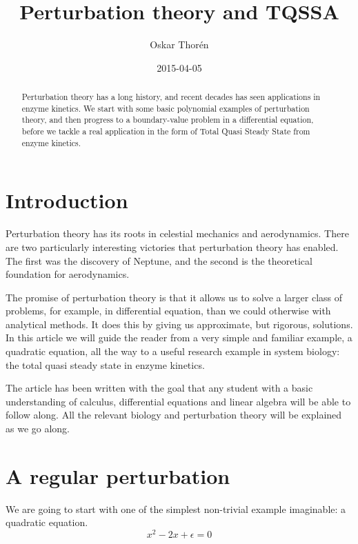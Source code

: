 \documentclass[12pt]{article}
\title{Perturbation theory and TQSSA}
\author{Oskar Thor\'{e}n}
\date{2015-04-05}
\begin{document}
\nocite{*} %
\maketitle

\begin{abstract}
Perturbation theory has a long history, and recent decades has seen applications
in enzyme kinetics. We start with some basic polynomial examples of perturbation
theory, and then progress to a boundary-value problem in a differential
equation, before we tackle a real application in the form of Total Quasi Steady
State from enzyme kinetics.
\end{abstract}

\clearpage
\tableofcontents
\clearpage

\section{Introduction}

Perturbation theory has its roots in celestial mechanics and
aerodynamics. There are two particularly interesting victories that
perturbation theory has enabled. The first was the discovery of
Neptune, and the second is the theoretical foundation for
aerodynamics.

The promise of perturbation theory is that it allows us to solve a
larger class of problems, for example, in differential equation, than
we could otherwise with analytical methods. It does this by giving us
approximate, but rigorous, solutions. In this article we will guide
the reader from a very simple and familiar example, a quadratic
equation, all the way to a useful research example in system biology:
the total quasi steady state in enzyme kinetics.

The article has been written with the goal that any student with a basic
understanding of calculus, differential equations and linear algebra will be
able to follow along. All the relevant biology and perturbation theory will be
explained as we go along.

\section{A regular perturbation}

We are going to start with one of the simplest non-trivial example imaginable:
a quadratic equation.
\begin{equation}
x^2 - 2x + \epsilon = 0
\end{equation}
\end{document}
